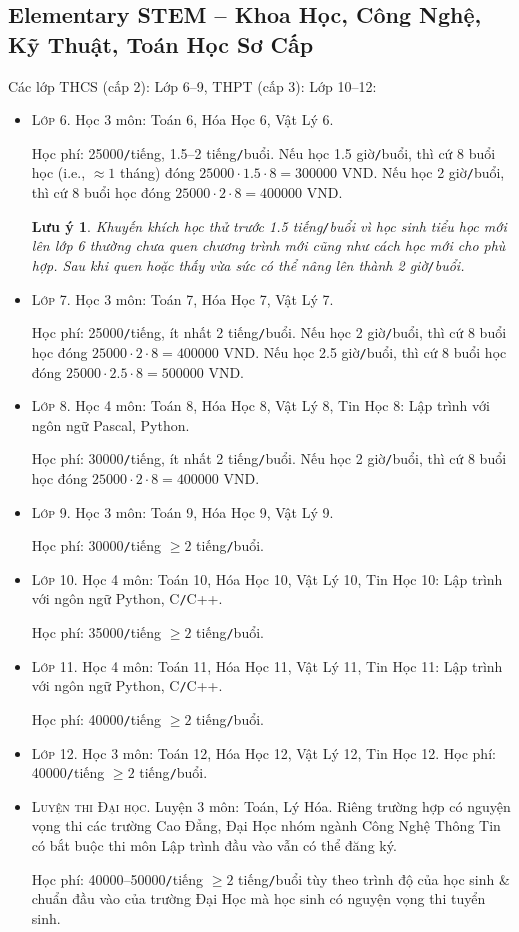 \documentclass{article}
\numberwithin{equation}{section}
\newtheorem{luuy}{Lưu ý}[section]
\begin{document}
\subsection{Elementary STEM -- Khoa Học, Công Nghệ, Kỹ Thuật, Toán Học Sơ Cấp}
Các lớp THCS (cấp 2): Lớp 6--9, THPT (cấp 3): Lớp 10--12:
\begin{itemize}
	\item \textsc{Lớp 6.} Học 3 môn: Toán 6, Hóa Học 6, Vật Lý 6.
	
	{\sf Học phí:} 25000{\tt/}tiếng, 1.5--2 tiếng{\tt/}buổi. Nếu học 1.5 giờ{\tt/}buổi, thì cứ 8 buổi học (i.e., $\approx1$ tháng) đóng $25000\cdot1.5\cdot8 = 300000$ VND. Nếu học 2 giờ{\tt/}buổi, thì cứ 8 buổi học đóng $25000\cdot2\cdot8 = 400000$ VND.
	
	\begin{luuy}
		Khuyến khích học thử trước 1.5 tiếng{\tt/}buổi vì học sinh tiểu học mới lên lớp 6 thường chưa quen chương trình mới cũng như cách học mới cho phù hợp. Sau khi quen hoặc thấy vừa sức có thể nâng lên thành 2 giờ{\tt/}buổi.
	\end{luuy}
	\item \textsc{Lớp 7.} Học 3 môn: Toán 7, Hóa Học 7, Vật Lý 7.
	
	{\sf Học phí:} 25000{\tt/}tiếng, ít nhất 2 tiếng{\tt/}buổi. Nếu học 2 giờ{\tt/}buổi, thì cứ 8 buổi học đóng $25000\cdot2\cdot8 = 400000$ VND. Nếu học 2.5 giờ{\tt/}buổi, thì cứ 8 buổi học đóng $25000\cdot2.5\cdot8 = 500000$ VND. 
	\item \textsc{Lớp 8.} Học 4 môn: Toán 8, Hóa Học 8, Vật Lý 8, Tin Học 8: Lập trình với ngôn ngữ Pascal, Python.
	
	{\sf Học phí:} 30000{\tt/}tiếng, ít nhất 2 tiếng{\tt/}buổi. Nếu học 2 giờ{\tt/}buổi, thì cứ 8 buổi học đóng $25000\cdot2\cdot8 = 400000$ VND.
	\item \textsc{Lớp 9.} Học 3 môn: Toán 9, Hóa Học 9, Vật Lý 9.
	
	{\sf Học phí:} 30000{\tt/}tiếng $\ge2$ tiếng{\tt/}buổi.
	\item \textsc{Lớp 10.} Học 4 môn: Toán 10, Hóa Học 10, Vật Lý 10, Tin Học 10: Lập trình với ngôn ngữ Python, C{\tt/}C++.
	
	{\sf Học phí:} 35000{\tt/}tiếng $\ge2$ tiếng{\tt/}buổi.
	\item \textsc{Lớp 11.} Học 4 môn: Toán 11, Hóa Học 11, Vật Lý 11, Tin Học 11: Lập trình với ngôn ngữ Python, C{\tt/}C++.
	
	{\sf Học phí:} 40000{\tt/}tiếng $\ge2$ tiếng{\tt/}buổi.
	\item \textsc{Lớp 12.} Học 3 môn: Toán 12, Hóa Học 12, Vật Lý 12, Tin Học 12.
	{\sf Học phí:} 40000{\tt/}tiếng $\ge2$ tiếng{\tt/}buổi.
	\item \textsc{Luyện thi Đại học.} Luyện 3 môn: Toán, Lý Hóa. Riêng trường hợp có nguyện vọng thi các trường Cao Đẳng, Đại Học nhóm ngành Công Nghệ Thông Tin có bắt buộc thi môn Lập trình đầu vào vẫn có thể đăng ký.
	
	{\sf Học phí:} 40000--50000{\tt/}tiếng $\ge2$ tiếng{\tt/}buổi tùy theo trình độ của học sinh \& chuẩn đầu vào của trường Đại Học mà học sinh có nguyện vọng thi tuyển sinh.
\end{itemize}
\end{document}

